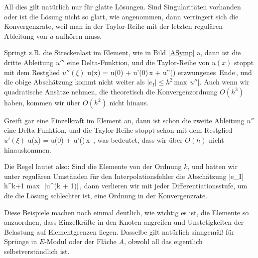 {All dies gilt nat\"{u}rlich nur f\"{u}r glatte L\"{o}sungen. Sind Singularit\"{a}ten vorhanden oder ist
die L\"{o}sung nicht so glatt, wie angenommen, dann verringert sich die Konvergenzrate, weil
man in der Taylor-Reihe mit der letzten regul\"{a}ren Ableitung von $u$ aufh\"{o}ren muss.

Springt z.B. die Streckenlast im Element, wie in Bild \ref{ASymp} a, dann ist die dritte
Ableitung $u'''$ eine Delta-Funktion, und die Taylor-Reihe von $u(x)$ stoppt mit dem
Restglied $u''(\xi)$
\bfoo
u(x) = u(0) + u'(0)\,x + u''(\xi) \qquad \leftarrow \qquad
\mbox{erzwungenes Ende}\,,
\efoo
und die obige Absch\"{a}tzung kommt nicht weiter als $|e_I| \leq h^2 \,\mbox{max}\,|u''|$.
Auch wenn wir quadratische Ans\"{a}tze nehmen, die theoretisch die Konvergenzordnung $O(h^3)$
haben, kommen wir \"{u}ber $O(h^2)$ nicht hinaus.

Greift gar eine Einzelkraft im Element an, dann ist schon die zweite Ableitung $u''$ eine
Delta-Funktion, und die Taylor-Reihe stoppt schon mit dem Restglied $u'(\xi)$
\bfoo
u(x) = u(0) + u'(\xi)\,x  \,,
\efoo
was bedeutet, dass wir \"{u}ber $O(h)$ nicht hinauskommen.

Die Regel lautet also: Sind die Elemente von der Ordnung $k$, und h\"{a}tten wir unter
regul\"{a}ren Umst\"{a}nden f\"{u}r den Interpolationsfehler die Absch\"{a}tzung
\bfoo
|e_I| \leq h^{k+1} \mbox{max\/}\,\, |u^{(k + 1)}|\,,
\efoo
dann verlieren wir mit jeder Differentiationsstufe, um die die L\"{o}sung schlechter ist,
eine Ordnung in der Konvergenzrate.

Diese Beispiele machen noch einmal deutlich, wie wichtig es ist, die Elemente so
anzuordnen, dass Einzelkr\"{a}fte in den Knoten angreifen und Unstetigkeiten der Belastung
auf Elementgrenzen liegen. Dasselbe gilt nat\"{u}rlich sinngem\"{a}{\ss} f\"{u}r Spr\"{u}nge in $E$-Modul
oder der Fl\"{a}che $A$, obwohl all das eigentlich selbstverst\"{a}ndlich ist.

}
